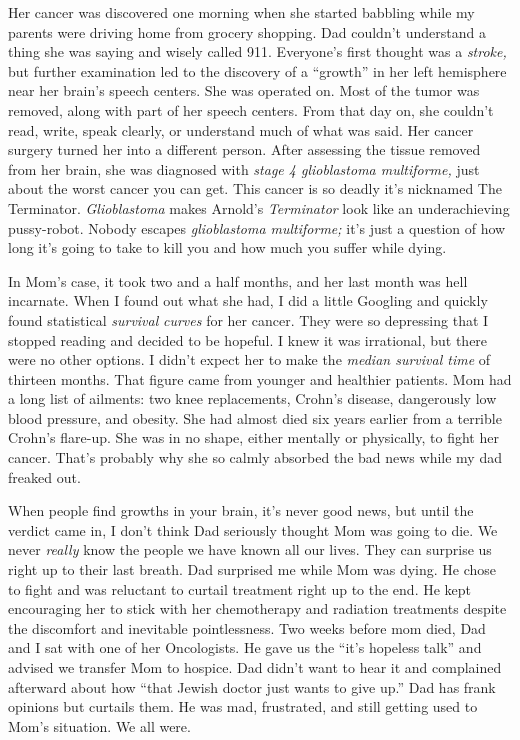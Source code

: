 Her cancer was discovered one morning when she started babbling while my
parents were driving home from grocery shopping. Dad couldn't understand
a thing she was saying and wisely called 911. Everyone's first thought
was a \emph{stroke,} but further examination led to the discovery of a
``growth'' in her left hemisphere near her brain's speech centers. She
was operated on. Most of the tumor was removed, along with part of her
speech centers. From that day on, she couldn't read, write, speak
clearly, or understand much of what was said. Her cancer surgery turned
her into a different person. After assessing the tissue removed from her
brain, she was diagnosed with \emph{stage 4 glioblastoma multiforme‎,}
just about the worst cancer you can get. This cancer is so deadly it's
nicknamed The Terminator. \emph{Glioblastoma} makes Arnold's
\emph{Terminator} look like an underachieving pussy-robot. Nobody
escapes \emph{glioblastoma multiforme;} it's just a question of how long
it's going to take to kill you and how much you suffer while dying.

In Mom's case, it took two and a half months, and her last month was
hell incarnate. When I found out what she had, I did a little Googling
and quickly found statistical \emph{survival} \emph{curves} for her
cancer. They were so depressing that I stopped reading and decided to be
hopeful. I knew it was irrational, but there were no other options. I
didn't expect her to make the \emph{median survival time} of thirteen
months. That figure came from younger and healthier patients. Mom had a
long list of ailments: two knee replacements, Crohn's disease,
dangerously low blood pressure, and obesity. She had almost died six
years earlier from a terrible Crohn's flare-up. She was in no shape,
either mentally or physically, to fight her cancer. That's probably why
she so calmly absorbed the bad news while my dad freaked out.

When people find growths in your brain, it's never good news, but until
the verdict came in, I don't think Dad seriously thought Mom was going
to die. We never \emph{really} know the people we have known all our
lives. They can surprise us right up to their last breath. Dad surprised
me while Mom was dying. He chose to fight and was reluctant to curtail
treatment right up to the end. He kept encouraging her to stick with her
chemotherapy and radiation treatments despite the discomfort and
inevitable pointlessness. Two weeks before mom died, Dad and I sat with
one of her Oncologists. He gave us the ``it's hopeless talk'' and
advised we transfer Mom to hospice. Dad didn't want to hear it and
complained afterward about how ``that Jewish doctor just wants to give
up.'' Dad has frank opinions but curtails them. He was mad, frustrated,
and still getting used to Mom's situation. We all were.

